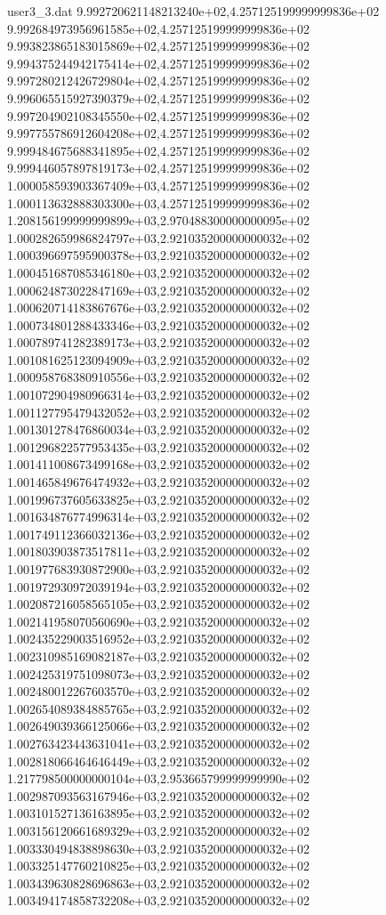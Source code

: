 \begin{filecontents}{user3_3.dat}
9.992720621148213240e+02,4.257125199999999836e+02
9.992684973956961585e+02,4.257125199999999836e+02
9.993823865183015869e+02,4.257125199999999836e+02
9.994375244942175414e+02,4.257125199999999836e+02
9.997280212426729804e+02,4.257125199999999836e+02
9.996065515927390379e+02,4.257125199999999836e+02
9.997204902108345550e+02,4.257125199999999836e+02
9.997755786912604208e+02,4.257125199999999836e+02
9.999484675688341895e+02,4.257125199999999836e+02
9.999446057897819173e+02,4.257125199999999836e+02
1.000058593903367409e+03,4.257125199999999836e+02
1.000113632888303300e+03,4.257125199999999836e+02
1.208156199999999899e+03,2.970488300000000095e+02
1.000282659986824797e+03,2.921035200000000032e+02
1.000396697595900378e+03,2.921035200000000032e+02
1.000451687085346180e+03,2.921035200000000032e+02
1.000624873022847169e+03,2.921035200000000032e+02
1.000620714183867676e+03,2.921035200000000032e+02
1.000734801288433346e+03,2.921035200000000032e+02
1.000789741282389173e+03,2.921035200000000032e+02
1.001081625123094909e+03,2.921035200000000032e+02
1.000958768380910556e+03,2.921035200000000032e+02
1.001072904980966314e+03,2.921035200000000032e+02
1.001127795479432052e+03,2.921035200000000032e+02
1.001301278476860034e+03,2.921035200000000032e+02
1.001296822577953435e+03,2.921035200000000032e+02
1.001411008673499168e+03,2.921035200000000032e+02
1.001465849676474932e+03,2.921035200000000032e+02
1.001996737605633825e+03,2.921035200000000032e+02
1.001634876774996314e+03,2.921035200000000032e+02
1.001749112366032136e+03,2.921035200000000032e+02
1.001803903873517811e+03,2.921035200000000032e+02
1.001977683930872900e+03,2.921035200000000032e+02
1.001972930972039194e+03,2.921035200000000032e+02
1.002087216058565105e+03,2.921035200000000032e+02
1.002141958070560690e+03,2.921035200000000032e+02
1.002435229003516952e+03,2.921035200000000032e+02
1.002310985169082187e+03,2.921035200000000032e+02
1.002425319751098073e+03,2.921035200000000032e+02
1.002480012267603570e+03,2.921035200000000032e+02
1.002654089384885765e+03,2.921035200000000032e+02
1.002649039366125066e+03,2.921035200000000032e+02
1.002763423443631041e+03,2.921035200000000032e+02
1.002818066464646449e+03,2.921035200000000032e+02
1.217798500000000104e+03,2.953665799999999990e+02
1.002987093563167946e+03,2.921035200000000032e+02
1.003101527136163895e+03,2.921035200000000032e+02
1.003156120661689329e+03,2.921035200000000032e+02
1.003330494838898630e+03,2.921035200000000032e+02
1.003325147760210825e+03,2.921035200000000032e+02
1.003439630828696863e+03,2.921035200000000032e+02
1.003494174858732208e+03,2.921035200000000032e+02

\end{filecontents}
